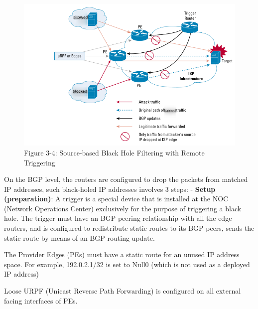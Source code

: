 \begin{figure}
\centering
\includegraphics{res/3-4-cisco-source.png}
\caption{Figure 3-4: Source-based Black Hole Filtering with Remote
Triggering}
\end{figure}

On the BGP level, the routers are configured to drop the packets from
matched IP addresses, such black-holed IP addresses involves 3 steps:
\cite{13_blackhole_cisco} \cite{14_blackhole_rfc} - \textbf{Setup
(preparation)}: A trigger is a special device that is installed at the
NOC (Network Operations Center) exclusively for the purpose of
triggering a black hole. The trigger must have an BGP peering
relationship with all the edge routers, and is configured to
redistribute static routes to its BGP peers, sends the static route by
means of an BGP routing update.

The Provider Edges (PEs) must have a static route for an unused IP
address space. For example, 192.0.2.1/32 is set to Null0 (which is not
used as a deployed IP address)

Loose URPF (Unicast Reverse Path Forwarding) is configured on all
external facing interfaces of PEs.

